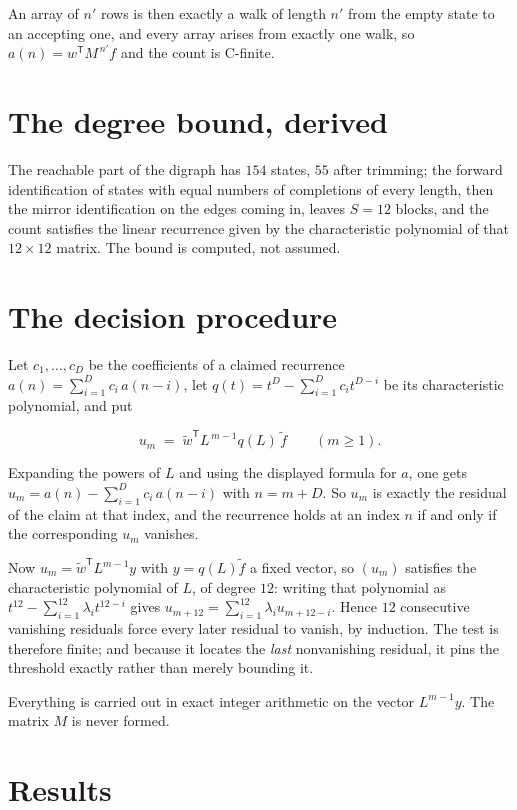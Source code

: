 \documentclass[11pt]{article}
\theoremstyle{definition}
\begin{document}
An array of $n'$ rows is then exactly a walk of length $n'$ from the empty state to an accepting one, and every array arises from exactly one walk, so $a(n) = w^{\mathsf T}M^{\,n'}f$ and the count is C-finite.

\section{The degree bound, derived}

The reachable part of the digraph has $154$ states, $55$ after trimming; the forward identification of states with equal numbers of completions of every length, then the mirror identification on the edges coming in, leaves $S = 12$ blocks, and the count satisfies the linear recurrence given by the characteristic polynomial of that $12\times12$ matrix. The bound is computed, not assumed.

\section{The decision procedure}

Let $c_1,\dots,c_D$ be the coefficients of a claimed recurrence $a(n) = \sum_{i=1}^{D} c_i\,a(n-i)$, let $q(t) = t^{D} - \sum_{i=1}^{D} c_i t^{D-i}$ be its characteristic polynomial, and put

\[u_m \;=\; \tilde w^{\mathsf T} L^{\,m-1} q(L)\,\tilde f \qquad (m \ge 1).\]

Expanding the powers of $L$ and using the displayed formula for $a$, one gets $u_m = a(n) - \sum_{i=1}^{D} c_i\,a(n-i)$ with $n = m + D$. So $u_m$ is exactly the residual of the claim at that index, and the recurrence holds at an index $n$ if and only if the corresponding $u_m$ vanishes.

Now $u_m = \tilde w^{\mathsf T} L^{m-1} y$ with $y = q(L)\tilde f$ a fixed vector, so $(u_m)$ satisfies the characteristic polynomial of $L$, of degree $12$: writing that polynomial as $t^{12} - \sum_{i=1}^{12} \lambda_i t^{12-i}$ gives $u_{m+12} = \sum_{i=1}^{12} \lambda_i u_{m+12-i}$. Hence $12$ consecutive vanishing residuals force every later residual to vanish, by induction. The test is therefore finite; and because it locates the {\itshape last} nonvanishing residual, it pins the threshold exactly rather than merely bounding it.

Everything is carried out in exact integer arithmetic on the vector $L^{m-1}y$. The matrix $M$ is never formed.

\section{Results}
\end{document}
